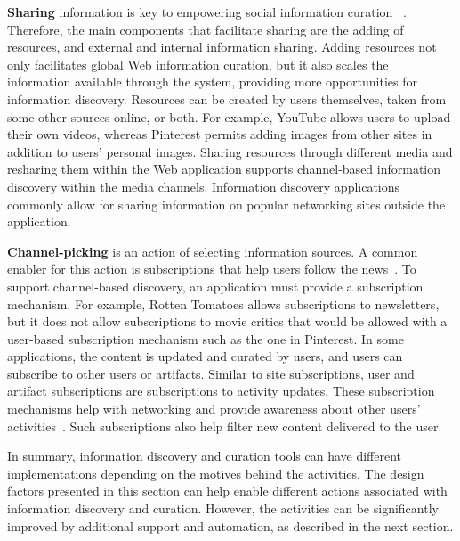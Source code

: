 \documentclass{sigchi}
\newcommand{\feature}[1]{{\ttfamily#1}}
\begin{document}
{{\textbf{Sharing}
information is key to empowering social information curation ~\cite{beagrie2008digital}. Therefore, the main components that facilitate sharing are the adding of resources, and external and internal information sharing.
%
\feature{Adding resources} not only facilitates global Web information curation, but it also scales the information available through the system, providing more opportunities for information discovery. Resources can be created by users themselves, taken from some other sources online, or both. For example, YouTube allows users to upload their own videos, whereas Pinterest permits adding images from other sites in addition to users' personal images. 
%
Sharing resources through different media and resharing them within the Web application supports channel-based information discovery within the media channels. Information discovery applications commonly allow for sharing information on popular networking sites outside the application.


\textbf{Channel-picking} is an action of selecting information sources. A common enabler for this action is subscriptions that help users follow the news~\cite{java2007feeds}. To support channel-based discovery, an application must provide a subscription mechanism. For example, Rotten Tomatoes allows \feature{subscriptions} to \feature{newsletters}, but it does not allow subscriptions to movie critics that would be allowed with a user-based subscription mechanism such as the one in Pinterest. 
%
In some applications, the content is updated and curated by users, and users can \feature{subscribe} to other \feature{users} or \feature{artifacts}. Similar to site subscriptions, user and artifact subscriptions are subscriptions to activity updates. These subscription mechanisms help with networking and provide awareness about other users' activities~\cite{millen2005social}. Such subscriptions also help filter new content delivered to the user. 
} %

In summary, information discovery and curation tools can have different implementations depending on the motives behind the activities. The design factors presented in this section can help enable different actions associated with information discovery and curation. However, the activities can be significantly improved by additional support and automation, as described in the next section.

}
\end{document}
